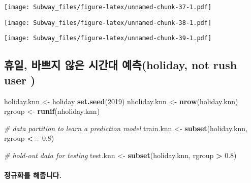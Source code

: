 \documentclass[]{article}
\newenvironment{Shaded}{\begin{snugshade}}{\end{snugshade}}
\newcommand{\KeywordTok}[1]{\textcolor[rgb]{0.13,0.29,0.53}{\textbf{#1}}}
\newcommand{\DecValTok}[1]{\textcolor[rgb]{0.00,0.00,0.81}{#1}}
\newcommand{\FloatTok}[1]{\textcolor[rgb]{0.00,0.00,0.81}{#1}}
\newcommand{\StringTok}[1]{\textcolor[rgb]{0.31,0.60,0.02}{#1}}
\newcommand{\CommentTok}[1]{\textcolor[rgb]{0.56,0.35,0.01}{\textit{#1}}}
\newcommand{\OperatorTok}[1]{\textcolor[rgb]{0.81,0.36,0.00}{\textbf{#1}}}
\newcommand{\NormalTok}[1]{#1}
\let\oldparagraph\paragraph
\renewcommand{\paragraph}[1]{\oldparagraph{#1}\mbox{}}
\begin{document}
\texttt{[image: Subway\_files/figure-latex/unnamed-chunk-37-1.pdf]}

\begin{Shaded}
\end{Shaded}

\texttt{[image: Subway\_files/figure-latex/unnamed-chunk-38-1.pdf]}

\begin{Shaded}
\end{Shaded}

\texttt{[image: Subway\_files/figure-latex/unnamed-chunk-39-1.pdf]}

\subsection{휴일, 바쁘지 않은 시간대 예측(holiday, not rush user
)}\label{----holiday-not-rush-user}

\begin{Shaded}
\begin{Highlighting}[]
\NormalTok{holiday.knn <-}\StringTok{ }\NormalTok{holiday}
\KeywordTok{set.seed}\NormalTok{(}\DecValTok{2019}\NormalTok{)}
\NormalTok{nholiday.knn <-}\StringTok{ }\KeywordTok{nrow}\NormalTok{(holiday.knn) }
\NormalTok{rgroup <-}\StringTok{ }\KeywordTok{runif}\NormalTok{(nholiday.knn)}

\CommentTok{# data partition to learn a prediction model }
\NormalTok{train.knn <-}\StringTok{ }\KeywordTok{subset}\NormalTok{(holiday.knn, rgroup }\OperatorTok{<=}\StringTok{ }\FloatTok{0.8}\NormalTok{)}

\CommentTok{# hold-out data for testing}
\NormalTok{test.knn <-}\StringTok{ }\KeywordTok{subset}\NormalTok{(holiday.knn, rgroup }\OperatorTok{>}\StringTok{ }\FloatTok{0.8}\NormalTok{)}
\end{Highlighting}
\end{Shaded}

\paragraph{정규화를 해줍니다.}\label{-.}
\end{document}
